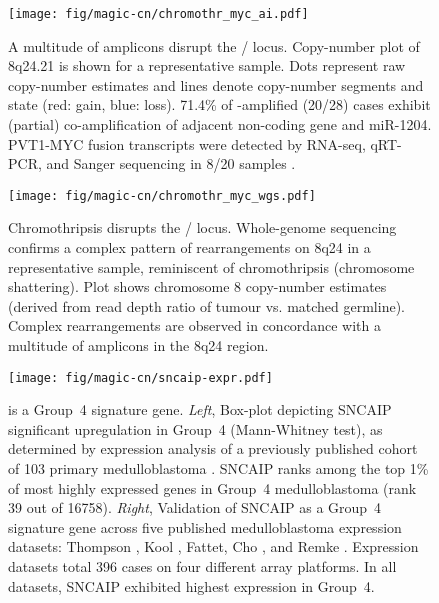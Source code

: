 \clearpage


\begin{figure}[t]
	\begin{center}
		\texttt{[image: fig/magic-cn/chromothr\_myc\_ai.pdf]}
	\end{center}
	\caption[A multitude of amplicons disrupt the / locus]
	{
	A multitude of amplicons disrupt the / locus.
	Copy-number plot of 8q24.21 is shown for a representative sample. Dots represent raw copy-number estimates and lines denote copy-number segments and state (red: gain, blue: loss). 71.4\% of -amplified (20/28) cases exhibit (partial) co-amplification of adjacent non-coding  gene and miR-1204. PVT1-MYC fusion transcripts were detected by RNA-seq, qRT-PCR, and Sanger sequencing in 8/20 samples .
	}
	\label{fig:chromothr_myc}
\end{figure}

\begin{figure}[b]
	\begin{center}
		\texttt{[image: fig/magic-cn/chromothr\_myc\_wgs.pdf]}
	\end{center}
	\caption[Chromothripsis disrupts the / locus.]
	{
	Chromothripsis disrupts the / locus.
	Whole-genome sequencing confirms a complex pattern of rearrangements on 8q24 in a representative sample, reminiscent of chromothripsis (chromosome shattering).
	Plot shows chromosome 8 copy-number estimates (derived from read depth ratio of tumour vs. matched germline).
	Complex rearrangements are observed in concordance with a multitude of amplicons in the 8q24 region.
	}
	\label{fig:chromothr_myc_wgs}
\end{figure}

\clearpage

\begin{figure}[t]
	\begin{center}
		\texttt{[image: fig/magic-cn/sncaip-expr.pdf]}
	\end{center}
	\caption[ is a Group~4 signature gene]
	{
	 is a Group~4 signature gene.
	\emph{Left}, Box-plot depicting SNCAIP significant upregulation in Group~4 (Mann-Whitney test), as determined by expression analysis of a previously published cohort of 103 primary medulloblastoma . SNCAIP ranks among the top 1\% of most highly expressed genes in Group~4 medulloblastoma (rank 39 out of 16758).
	\emph{Right}, Validation of SNCAIP as a Group~4 signature gene across five published medulloblastoma expression datasets: Thompson , Kool , Fattet, Cho , and Remke . Expression datasets total 396 cases on four different array platforms. In all datasets, SNCAIP exhibited highest expression in Group~4.
	}
	\label{fig:sncaip-expr}
\end{figure}

